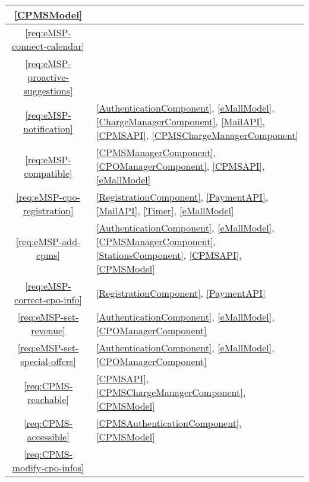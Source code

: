 \begin{table}[h]
\begin{center}
\begin{tabular}{|c||p{15.5cm}|}
            \ref{CPMSModel}
            \\
            \hline
            \ref{req:eMSP-connect-calendar} & 
            \\
            \hline
            \ref{req:eMSP-proactive-suggestions} & 
            \\
            \hline
            \ref{req:eMSP-notification} &
            \ref{AuthenticationComponent},
            \ref{eMallModel},
            \ref{ChargeManagerComponent},
            \ref{MailAPI},
            \ref{CPMSAPI},
            \ref{CPMSChargeManagerComponent}
            \\
            \hline
            \ref{req:eMSP-compatible} &
            \ref{CPMSManagerComponent},
            \ref{CPOManagerComponent},
            \ref{CPMSAPI},
            \ref{eMallModel}
            \\
            \hline
            \ref{req:eMSP-cpo-registration} &
            \ref{RegistrationComponent},
            \ref{PaymentAPI},
            \ref{MailAPI},
            \ref{Timer},
            \ref{eMallModel}
            \\
            \hline
            \ref{req:eMSP-add-cpms} &
            \ref{AuthenticationComponent},
            \ref{eMallModel},
            \ref{CPMSManagerComponent},
            \ref{StationsComponent},
            \ref{CPMSAPI},
            \ref{CPMSModel}
            \\
            \hline
            \ref{req:eMSP-correct-cpo-info} &
            \ref{RegistrationComponent},
            \ref{PaymentAPI}
            \\
            \hline
            \ref{req:eMSP-set-revenue} &
            \ref{AuthenticationComponent},
            \ref{eMallModel},
            \ref{CPOManagerComponent}
            \\
            \hline
            \ref{req:eMSP-set-special-offers} &
            \ref{AuthenticationComponent},
            \ref{eMallModel},
            \ref{CPOManagerComponent}
            \\
            \hline
            \ref{req:CPMS-reachable} &
            \ref{CPMSAPI},
            \ref{CPMSChargeManagerComponent},
            \ref{CPMSModel}
            \\
            \hline
            \ref{req:CPMS-accessible} &
            \ref{CPMSAuthenticationComponent},
            \ref{CPMSModel}
            \\
            \hline
            \ref{req:CPMS-modify-cpo-infos} &

\end{tabular}
\end{center}
\end{table}

